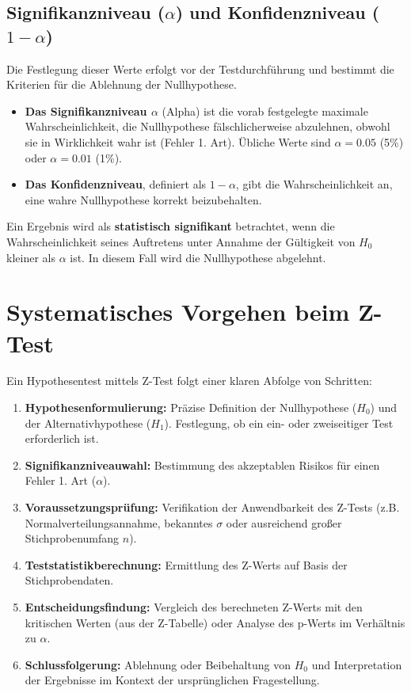 \subsection{Signifikanzniveau ($\alpha$) und Konfidenzniveau ($1-\alpha$)}
Die Festlegung dieser Werte erfolgt vor der Testdurchführung und bestimmt die
Kriterien für die Ablehnung der Nullhypothese.
\begin{itemize}
    \item \textbf{Das Signifikanzniveau $\alpha$} (Alpha) ist die vorab festgelegte maximale Wahrscheinlichkeit, die Nullhypothese fälschlicherweise abzulehnen, obwohl sie in Wirklichkeit wahr ist (Fehler 1. Art). Übliche Werte sind $\alpha = 0.05$ (5\%) oder $\alpha = 0.01$ (1\%).
    \item \textbf{Das Konfidenzniveau}, definiert als $1-\alpha$, gibt die Wahrscheinlichkeit an, eine wahre Nullhypothese korrekt beizubehalten.
\end{itemize}
Ein Ergebnis wird als \textbf{statistisch signifikant} betrachtet, wenn die Wahrscheinlichkeit seines Auftretens unter Annahme der Gültigkeit von $H_0$ kleiner als $\alpha$ ist. In diesem Fall wird die Nullhypothese abgelehnt.

\section{Systematisches Vorgehen beim Z-Test}
Ein Hypothesentest mittels Z-Test folgt einer klaren Abfolge von Schritten:
\begin{enumerate}
    \item \textbf{Hypothesenformulierung:} Präzise Definition der Nullhypothese ($H_0$) und der Alternativhypothese ($H_1$). Festlegung, ob ein ein- oder zweiseitiger Test erforderlich ist.
    \item \textbf{Signifikanzniveauwahl:} Bestimmung des akzeptablen Risikos für einen Fehler 1. Art ($\alpha$).
    \item \textbf{Voraussetzungsprüfung:} Verifikation der Anwendbarkeit des Z-Tests (z.B. Normalverteilungsannahme, bekanntes $\sigma$ oder ausreichend großer Stichprobenumfang $n$).
    \item \textbf{Teststatistikberechnung:} Ermittlung des Z-Werts auf Basis der Stichprobendaten.
    \item \textbf{Entscheidungsfindung:} Vergleich des berechneten Z-Werts mit den kritischen Werten (aus der Z-Tabelle) oder Analyse des p-Werts im Verhältnis zu $\alpha$.
    \item \textbf{Schlussfolgerung:} Ablehnung oder Beibehaltung von $H_0$ und Interpretation der Ergebnisse im Kontext der ursprünglichen Fragestellung.
\end{enumerate}

